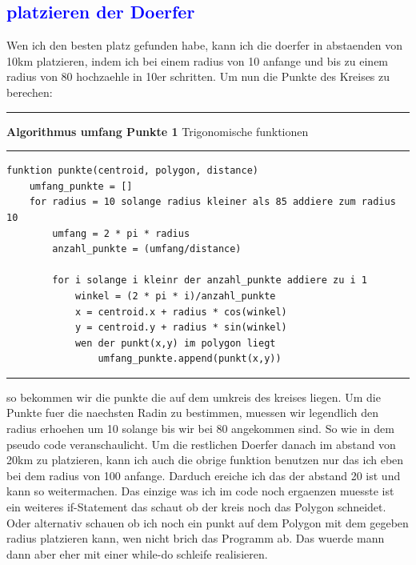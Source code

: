 \documentclass{article}
\begin{document}
\subsection{\textcolor{blue}{platzieren der Doerfer}}\label{sec:platzieren der Doerfer}
Wen ich den besten platz gefunden habe, kann ich die doerfer in abstaenden von 10km platzieren, indem ich bei einem radius von 10 anfange und bis zu einem radius von 80 hochzaehle in 10er schritten. Um nun die Punkte des Kreises zu berechen:
\vspace{5pt}
\hrule
\vspace{1.5pt}
\large{\textbf{Algorithmus umfang Punkte 1} Trigonomische funktionen}
\vspace{1.5pt}
\hrule
\begin{verbatim}
funktion punkte(centroid, polygon, distance)
	umfang_punkte = []
	for radius = 10 solange radius kleiner als 85 addiere zum radius 10
		umfang = 2 * pi * radius
		anzahl_punkte = (umfang/distance)
		
		for i solange i kleinr der anzahl_punkte addiere zu i 1
			winkel = (2 * pi * i)/anzahl_punkte
			x = centroid.x + radius * cos(winkel)
			y = centroid.y + radius * sin(winkel)
			wen der punkt(x,y) im polygon liegt
				umfang_punkte.append(punkt(x,y))
\end{verbatim}
\hrule
\vspace{5pt}
so bekommen wir die punkte die auf dem umkreis des kreises liegen. Um die Punkte fuer die naechsten Radin zu bestimmen, muessen wir legendlich den radius erhoehen um 10 solange bis wir bei 80 angekommen sind. So wie in dem pseudo code veranschaulicht. Um die restlichen Doerfer danach im abstand von 20km zu platzieren, kann ich auch die obrige funktion benutzen nur das ich eben bei dem radius von 100 anfange. Darduch ereiche ich das der abstand 20 ist und kann so weitermachen. Das einzige was ich im code noch ergaenzen muesste ist ein weiteres if-Statement das schaut ob der kreis noch das Polygon schneidet. Oder alternativ schauen ob ich noch ein punkt auf dem Polygon mit dem gegeben radius platzieren kann, wen nicht brich das Programm ab. Das wuerde mann dann aber eher mit einer while-do schleife realisieren. 
\end{document}
